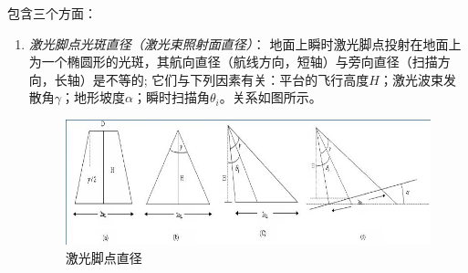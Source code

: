 包含三个方面：
\begin{enumerate}
	\item \textit{激光脚点光斑直径（激光束照射面直径）}：
		地面上瞬时激光脚点投射在地面上为一个椭圆形的光斑，其航向直径（航线方向，短轴）与旁向直径（扫描方向，长轴）是不等的;
		它们与下列因素有关：平台的飞行高度$ H $；激光波束发散角$ γ $；地形坡度$ α $；瞬时扫描角$ θ_i $。关系如图所示。
		
		\begin{figure}[htbp]
			\centering
			\includegraphics[width=\linewidth]{figure/Chapter4/激光脚点直径}
			\caption{激光脚点直径}
			\label{fig:激光脚点直径}
		\end{figure}
		

\end{enumerate}
